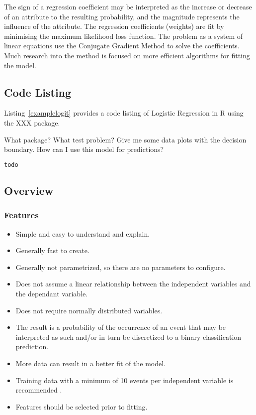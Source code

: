 The sign of a regression coefficient may be interpreted as the increase or decrease of an attribute to the resulting probability, and the magnitude represents the influence of the attribute.
The regression coefficients (weights) are fit by minimising the maximum likelihood loss function. The problem as a system of linear equations use the Conjugate Gradient Method to solve the coefficients. Much research into the method is focused on more efficient algorithms for fitting the model.


\subsection{Code Listing}
Listing~\ref{examplelogit} provides a code listing of Logistic Regression in R using the XXX package.

What package?
What test problem?
Give me some data plots with the decision boundary.
How can I use this model for predictions?

\begin{lstlisting}[language=r,label=examplelogit,caption={Example of Logistic Regression in R}]
	todo
\end{lstlisting}

\subsection{Overview}

\subsubsection{Features}

\begin{itemize}
	\item Simple and easy to understand and explain.
	\item Generally fast to create.
	\item Generally not parametrized, so there are no parameters to configure. 
	\item Does not assume a linear relationship between the independent variables and the dependant variable. 
	\item Does not require normally distributed variables.
	\item The result is a probability of the occurrence of an event that may be interpreted as such and/or in turn be discretized to a binary classification prediction.
	\item More data can result in a better fit of the model.
	\item Training data with a minimum of 10 events per independent variable is recommended \cite{Peduzzi1996}.
	\item Features should be selected prior to fitting.
\end{itemize}

